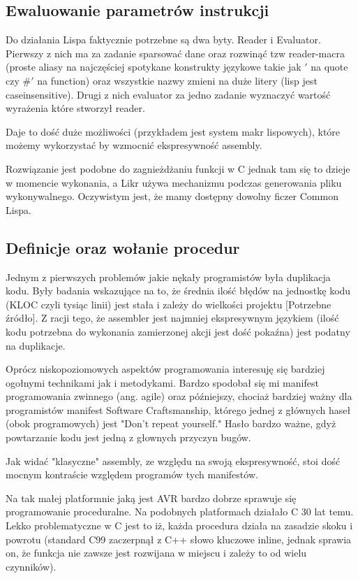 \documentclass[11pt]{article}
\begin{document}
\subsection{Ewaluowanie parametrów instrukcji}

Do działania Lispa faktycznie potrzebne są dwa byty. Reader i Evaluator. Pierwszy z nich ma za zadanie sparsować dane oraz rozwinąć tzw reader-macra (proste aliasy na najczęściej spotykane konstrukty językowe takie jak $'$ na quote czy $\#'$ na function) oraz wszystkie nazwy zmieni na duże litery (lisp jest caseinsensitive). Drugi z nich  evaluator za jedno zadanie wyznaczyć wartość wyrażenia które stworzył reader. 

Daje to dość duże możliwości (przykładem jest system makr lispowych), które możemy wykorzystać by wzmocnić ekspresywność assembly. 



Rozwiązanie jest podobne do zagnieżdżaniu funkcji w C jednak tam się to dzieje w momencie wykonania, a Likr używa mechanizmu podczas generowania pliku wykonywalnego. Oczywistym jest, że mamy dostępny dowolny ficzer Common Lispa.

\subsection{Definicje oraz wołanie procedur}

Jednym z pierwszych problemów jakie nękały programistów była duplikacja kodu. Były badania wskazujące na to, że  średnia ilość błędów na jednostkę kodu (KLOC czyli tysiąc linii) jest stała i zależy do wielkości projektu [Potrzebne źródło]. Z racji tego, że assembler jest najmniej ekspresywnym językiem (ilość kodu potrzebna do wykonania zamierzonej akcji jest dość pokaźna) jest podatny na duplikacje.

Oprócz niskopoziomowych aspektów programowania interesuję się bardziej ogołnymi technikami jak i metodykami. Bardzo spodobał się mi manifest programowania zwinnego (ang. agile) oraz późniejszy, chociaż bardziej ważny dla programistów manifest Software Craftsmanship, którego jednej z głównych haseł (obok programowych) jest "Don't repeat yourself." Hasło bardzo ważne, gdyż powtarzanie kodu jest jedną z głownych przyczyn bugów. 

Jak widać "klasyczne" assembly, ze względu na swoją ekspresywność, stoi dość mocnym kontraście względem
programów tych manifestów. 

Na tak małej platformnie jaką jest AVR bardzo dobrze sprawuje się programowanie proceduralne. Na podobnych platformach działało C 30 lat temu. Lekko problematyczne w C jest to iż, każda procedura działa na zasadzie skoku i powrotu (standard C99 zaczerpnął z C++ słowo kluczowe inline, jednak sprawia on, że funkcja nie zawsze jest rozwijana w miejscu i zależy to od wielu czynników). 
\end{document}
